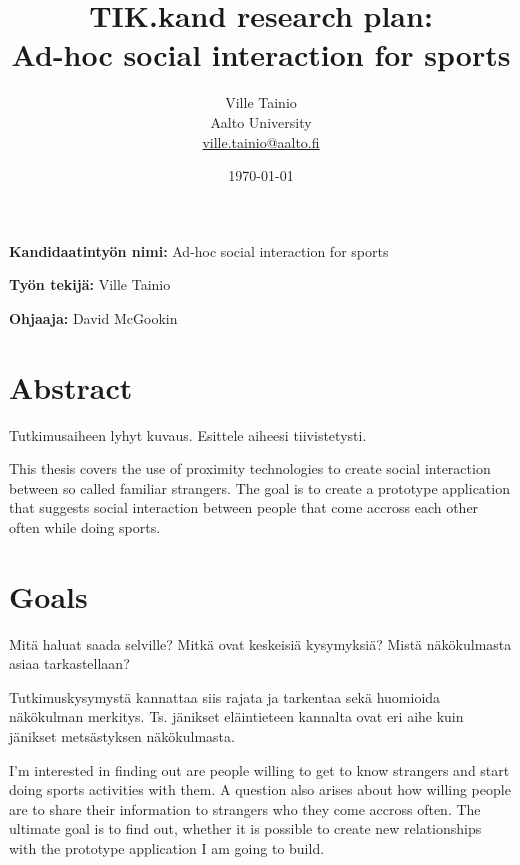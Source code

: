 \documentclass[12pt,a4paper,finnish,oneside]{article}
\begin{document}

\title{TIK.kand research plan:\\[5mm]
Ad-hoc social interaction for sports}

\author{Ville Tainio\\
Aalto University\\
\url{ville.tainio@aalto.fi}}

\date{\today}

\maketitle


%

\textbf{Kandidaatintyön nimi:} Ad-hoc social interaction for sports

\textbf{Työn tekijä:} Ville Tainio

\textbf{Ohjaaja:} David McGookin


\section{Abstract}

Tutkimusaiheen lyhyt kuvaus. Esittele aiheesi tiivistetysti.

This thesis covers the use of proximity technologies to create social
interaction between so called familiar strangers. The goal is to create a
prototype application that suggests social interaction between people that
come accross each other often while doing sports.

\section{Goals}

Mitä haluat saada selville? Mitkä ovat keskeisiä kysymyksiä? Mistä
näkökulmasta asiaa tarkastellaan?

Tutkimuskysymystä kannattaa siis rajata ja tarkentaa sekä huomioida
näkökulman merkitys. Ts. jänikset eläintieteen kannalta ovat eri aihe
kuin jänikset metsästyksen näkökulmasta.

I'm interested in finding out are people willing to get to know strangers
and start doing sports activities with them. A question also arises about how
willing people are to share their information to strangers who they come accross
often. The ultimate goal is to find out, whether it is possible to create new
relationships with the prototype application I am going to build.
\end{document}
